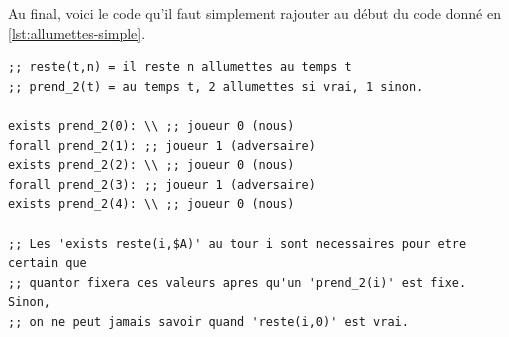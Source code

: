 Au final, voici le code \touist qu'il faut simplement rajouter au début du code donné en \ref{lst:allumettes-simple}.

\begin{lstlisting}[language=touist]
;; reste(t,n) = il reste n allumettes au temps t
;; prend_2(t) = au temps t, 2 allumettes si vrai, 1 sinon.

exists prend_2(0): \\ ;; joueur 0 (nous)
forall prend_2(1): ;; joueur 1 (adversaire)
exists prend_2(2): \\ ;; joueur 0 (nous)
forall prend_2(3): ;; joueur 1 (adversaire)
exists prend_2(4): \\ ;; joueur 0 (nous)

;; Les 'exists reste(i,$A)' au tour i sont necessaires pour etre certain que
;; quantor fixera ces valeurs apres qu'un 'prend_2(i)' est fixe. Sinon,
;; on ne peut jamais savoir quand 'reste(i,0)' est vrai.
\end{lstlisting}